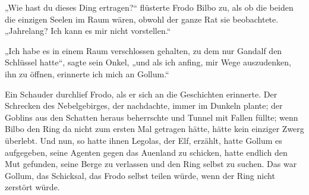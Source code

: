 „Wie hast du dieses Ding ertragen?“ flüsterte Frodo Bilbo zu, als ob die beiden die einzigen Seelen im Raum wären, obwohl der ganze Rat sie beobachtete. „Jahrelang? Ich kann es mir nicht vorstellen.“

„Ich habe es in einem Raum verschlossen gehalten, zu dem nur Gandalf den Schlüssel hatte“, sagte sein Onkel, „und als ich anfing, mir Wege auszudenken, ihn zu öffnen, erinnerte ich mich an Gollum.“

Ein Schauder durchlief Frodo, als er sich an die Geschichten erinnerte. Der Schrecken des Nebelgebirges, der nachdachte, immer im Dunkeln plante; der Goblins aus den Schatten heraus beherrschte und Tunnel mit Fallen füllte; wenn Bilbo den Ring da nicht zum ersten Mal getragen hätte, hätte kein einziger Zwerg überlebt. Und nun, so hatte ihnen Legolas, der Elf, erzählt, hatte Gollum es aufgegeben, seine Agenten gegen das Auenland zu schicken, hatte endlich den Mut gefunden, seine Berge zu verlassen und den Ring selbst zu suchen. Das war Gollum, das Schicksal, das Frodo selbst teilen würde, wenn der Ring nicht zerstört würde.

